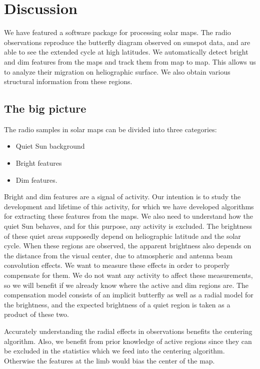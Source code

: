 \documentclass{aa}
\begin{document}
\section{Discussion}

We have featured a software package for processing solar maps. The radio observations reproduce the butterfly diagram 
observed on sunspot data, and are able to see the extended cycle at high latitudes. We automatically detect bright and 
dim features from the maps and track them from map to map. This allows us to analyze their migration on heliographic 
surface. We also obtain various structural information from these regions.

\subsection{The big picture}

The radio samples in solar maps can be divided into three categories: \begin{itemize} \item Quiet Sun background \item 
Bright features \item Dim features. \end{itemize} Bright and dim features are a signal of activity. Our intention is to 
study the development and lifetime of this activity, for which we have developed algorithms for extracting these 
features from the maps. We also need to understand how the quiet Sun behaves, and for this purpose, any activity is 
excluded. The brightness of these quiet areas supposedly depend on heliographic latitude and the solar cycle. When these 
regions are observed, the apparent brightness also depends on the distance from the visual center, due to atmospheric 
and antenna beam convolution effects. We want to measure these effects in order to properly compensate for them. We do 
not want any activity to affect these measurements, so we will benefit if we already know where the active and dim 
regions are. The compensation model consists of an implicit butterfly as well as a radial model for the brightness, and 
the expected brightness of a quiet region is taken as a product of these two.

Accurately understanding the radial effects in observations benefits the centering algorithm. Also, we benefit from 
prior knowledge of active regions since they can be excluded in the statistics which we feed into the centering 
algorithm. Otherwise the features at the limb would bias the center of the map.
\end{document}
